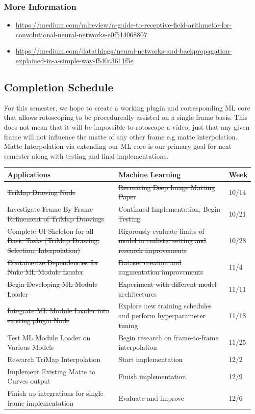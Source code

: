\documentclass[15pt]{article}
\begin{document}
\subsubsection{More Information}
\label{sec:org2c47e66}
\begin{itemize}
\item \url{https://medium.com/mlreview/a-guide-to-receptive-field-arithmetic-for-convolutional-neural-networks-e0f514068807}
\item \url{https://medium.com/datathings/neural-networks-and-backpropagation-explained-in-a-simple-way-f540a3611f5e}
\end{itemize}
\subsection{Completion Schedule}
\label{sec:orgaaa3358}
For this semester, we hope to create a working plugin and corresponding ML core
that allows rotoscoping to be procedureally assisted on a single frame basis.
This does not mean that it will be impossible to rotoscope a video, just that
any given frame will not influence the matte of any other frame e.g matte
interpolation. Matte Interpolation via extending our ML core is our primary goal
for next semester along with testing and final implementations.
\begin{center}
\begin{tabularx}{\textwidth}{XXl}
Applications & Machine Learning & Week\\
\hline
\sout{TriMap Drawing Node} & \sout{Recreating Deep Image Matting Paper} & 10/14\\
\hline
\sout{Investigate Frame By Frame Refinement of TriMap Drawings} & \sout{Continued Implementation, Begin Testing} & 10/21\\
\hline
\sout{Complete UI Skeleton for all Basic Tasks (TriMap Drawing, Selection, Interpolation)} & \sout{Rigorously evaluate limits of model in realistic setting and research improvements} & 10/28\\
\hline
\sout{Containerize Dependencies for Nuke ML Module Loader} & \sout{Dataset creation and augmentation improvements} & 11/4\\
\hline
\sout{Begin Developing ML Module Loader} & \sout{Experiment with different model architectures} & 11/11\\
\hline
\sout{Integrate ML Module Loader into existing plugin Node} & Explore new training schedules and perform hyperparameter tuning & 11/18\\
\hline
Test ML Module Loader on Various Models & Begin research on frame-to-frame interpolation & 11/25\\
\hline
Research TriMap Interpolation & Start implementation & 12/2\\
\hline
Implement Existing Matte to Curves output & Finish implementation & 12/9\\
\hline
Finish up integrations for single frame implementation & Evaluate and improve & 12/6\\
\end{tabularx}
\end{center}
\end{document}
